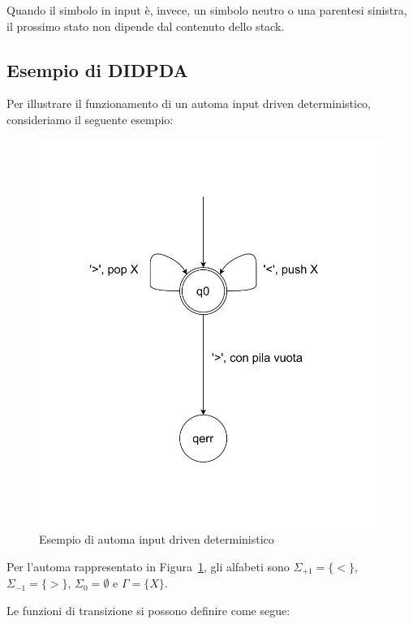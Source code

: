 \documentclass[a4paper,12pt]{report}
\begin{document}
    Quando il simbolo in input è, invece, un simbolo neutro o una parentesi sinistra, il prossimo stato non dipende dal contenuto dello stack.

    \clearpage
    \subsection{Esempio di DIDPDA}
    
    Per illustrare il funzionamento di un automa input driven deterministico, consideriamo il seguente esempio:
    
    \begin{figure}[H]
        \centering
        \includegraphics[width=4.2\textwidth,height=0.6\textheight,keepaspectratio]{img/automa_det}
        \caption{Esempio di automa input driven deterministico}
        \label{fig:esempio_didpda}
    \end{figure}

    Per l'automa rappresentato in Figura~\ref{fig:esempio_didpda}, gli alfabeti sono $\Sigma_{+1} = \{<\}$, $\Sigma_{-1} = \{>\}$, $\Sigma_0 = \emptyset$ e $\Gamma = \{X\}$.
    
    Le funzioni di transizione si possono definire come segue:
\end{document}
